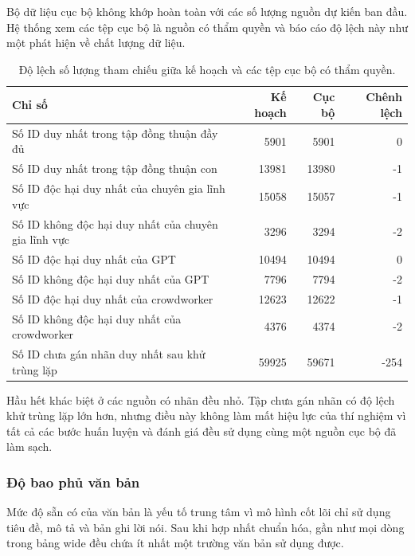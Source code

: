 Bộ dữ liệu cục bộ không khớp hoàn toàn với các số lượng nguồn dự kiến ban đầu. Hệ thống xem các tệp cục bộ là nguồn có thẩm quyền và báo cáo độ lệch này như một phát hiện về chất lượng dữ liệu.

\begin{table}[H]
\centering
\scriptsize
\renewcommand{\arraystretch}{1.2}
\begin{tabularx}{\textwidth}{|>{\raggedright\arraybackslash}X|r|r|r|}
\hline
\textbf{Chỉ số} & \textbf{Kế hoạch} & \textbf{Cục bộ} & \textbf{Chênh lệch} \\
\hline
Số ID duy nhất trong tập đồng thuận đầy đủ & 5901 & 5901 & 0 \\
\hline
Số ID duy nhất trong tập đồng thuận con & 13981 & 13980 & -1 \\
\hline
Số ID độc hại duy nhất của chuyên gia lĩnh vực & 15058 & 15057 & -1 \\
\hline
Số ID không độc hại duy nhất của chuyên gia lĩnh vực & 3296 & 3294 & -2 \\
\hline
Số ID độc hại duy nhất của GPT & 10494 & 10494 & 0 \\
\hline
Số ID không độc hại duy nhất của GPT & 7796 & 7794 & -2 \\
\hline
Số ID độc hại duy nhất của crowdworker & 12623 & 12622 & -1 \\
\hline
Số ID không độc hại duy nhất của crowdworker & 4376 & 4374 & -2 \\
\hline
Số ID chưa gán nhãn duy nhất sau khử trùng lặp & 59925 & 59671 & -254 \\
\hline
\end{tabularx}
\caption{Độ lệch số lượng tham chiếu giữa kế hoạch và các tệp cục bộ có thẩm quyền.}
\label{tab:implementation-count-drift}
\end{table}

Hầu hết khác biệt ở các nguồn có nhãn đều nhỏ. Tập chưa gán nhãn có độ lệch khử trùng lặp lớn hơn, nhưng điều này không làm mất hiệu lực của thí nghiệm vì tất cả các bước huấn luyện và đánh giá đều sử dụng cùng một nguồn cục bộ đã làm sạch.

\subsubsection{Độ bao phủ văn bản}

Mức độ sẵn có của văn bản là yếu tố trung tâm vì mô hình cốt lõi chỉ sử dụng tiêu đề, mô tả và bản ghi lời nói. Sau khi hợp nhất chuẩn hóa, gần như mọi dòng trong bảng wide đều chứa ít nhất một trường văn bản sử dụng được.

